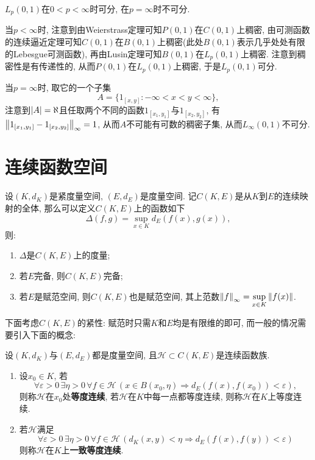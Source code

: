 	\begin{Proposition}
	$ L_p(0,1) $在$ 0<p<\infty $时可分, 在$ p=\infty $时不可分.
	\end{Proposition}
	\begin{Proof}
	当$ p<\infty $时, 注意到由Weierstrass定理可知$ P(0,1) $在$ C(0,1) $上稠密, 由可测函数的连续逼近定理可知$ C(0,1) $在$ B(0,1) $上稠密(此处$ B(0,1) $表示几乎处处有限的Lebesgue可测函数), 再由Lusin定理可知$ B(0,1) $在$ L_p(0,1) $上稠密. 注意到稠密性是有传递性的, 从而$ P(0,1) $在$ L_p(0,1) $上稠密, 于是$ L_p(0,1) $可分.
	
	当$ p=\infty $时, 取它的一个子集
	\[
	A=\{ 1_{[x,y]} : -\infty<x<y<\infty \},
	\]
	注意到$ \left| A \right| =\aleph $且任取两个不同的函数$ 1_{[x_1,y_1]} $与$ 1_{[x_2,y_2]} $, 有$ \left\| 1_{[x_1,y_1]}-1_{[x_2,y_2]} \right\|_\infty=1 $, 从而$ A $不可能有可数的稠密子集, 从而$ L_\infty(0,1) $不可分.
	\end{Proof}
	
\section{连续函数空间}
	
	设$ (K,d_K) $是紧度量空间, $ (E,d_E) $是度量空间. 记$ C(K,E) $是从$ K $到$ E $的连续映射的全体, 那么可以定义$ C(K,E) $上的函数如下
	\[
	\Delta(f,g)=\sup_{x\in K}d_E(f(x),g(x)),
	\]
	则:
	\begin{enumerate}[(1)]
	\item $ \Delta $是$ C(K,E) $上的度量;
	\item 若$ E $完备, 则$ C(K,E) $完备;
	\item 若$ E $是赋范空间, 则$ C(K,E) $也是赋范空间, 其上范数$ \left\| f \right\|_\infty=\sup\limits_{x\in K}\left\| f(x) \right\| $.
	\end{enumerate}
	下面考虑$ C(K,E) $的紧性: 赋范时只需$ K $和$ E $均是有限维的即可, 而一般的情况需要引入下面的概念:
	
	\begin{Definition}[等度连续]
	设$ (K,d_K) $与$ (E,d_E) $都是度量空间, 且$ \mathcal{H}\subset C(K,E) $是连续函数族.
	\begin{enumerate}[(1)]
	\item 设$ x_0\in K $, 若
	\[
	\forall\varepsilon>0\,\exists\eta>0\,\forall f\in\mathcal H\,(x\in B(x_0,\eta)\Rightarrow d_E(f(x),f(x_0))<\varepsilon),
	\]
	则称$ \mathcal H $在$ x_0 $处\textbf{等度连续}, 若$ \mathcal H $在$ K $中每一点都等度连续, 则称$ \mathcal H $在$ K $上等度连续.
	\item 若$ \mathcal H $满足
	\[
	\forall\varepsilon>0\,\exists\eta>0\,\forall f\in\mathcal H\,(d_K(x,y)<\eta\Rightarrow d_E(f(x),f(y))<\varepsilon)
	\]
	则称$ \mathcal H $在$ K $上\textbf{一致等度连续}.
	\end{enumerate}
	\end{Definition}
	
